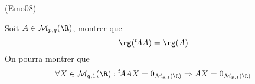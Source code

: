\begin{tiny}(Emo08)\end{tiny}
Soit $A\in \mathcal M_{p,q}(\R)$, montrer que
\begin{displaymath}
 \rg( \mathstrut^t\!AA)=\rg (A)
\end{displaymath}
On pourra montrer que 
\begin{displaymath}
 \forall X\in \mathcal M_{q,1}(\R) : \mathstrut^t\!AAX = 0_{\mathcal M_{q,1}(\R)}
\Rightarrow AX = 0_{\mathcal M_{p,1}(\R)}
\end{displaymath}
